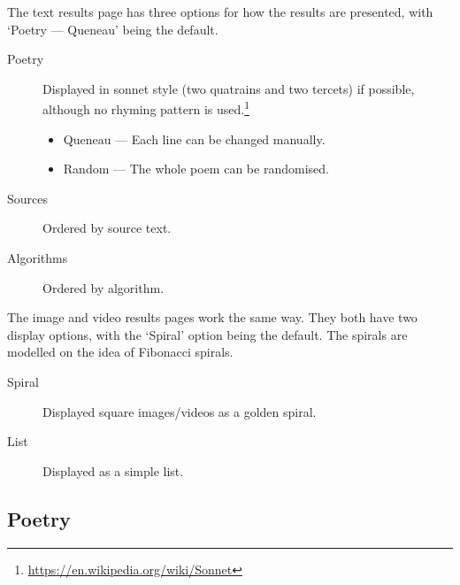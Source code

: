 %

The text results page has three options for how the results are presented, with `Poetry --- Queneau' being the default.
\begin{description}
  \item [Poetry] Displayed in sonnet style (two quatrains and two tercets) if possible, although no rhyming pattern is used.\footnote{\url{https://en.wikipedia.org/wiki/Sonnet}}
    \begin{itemize}
      \item Queneau --- Each line can be changed manually.
      \item Random --- The whole poem can be randomised.
    \end{itemize}
  \item [Sources] Ordered by source text.
  \item [Algorithms] Ordered by algorithm.
\end{description}


The image and video results pages work the same way. They both have two display options, with the `Spiral' option being the default. The spirals are modelled on the idea of Fibonacci spirals.
\begin{description}
  \item [Spiral] Displayed square images/videos as a golden spiral.
  \item [List] Displayed as a simple list.
\end{description}


\subsection{Poetry}
\label{s:poetry}

